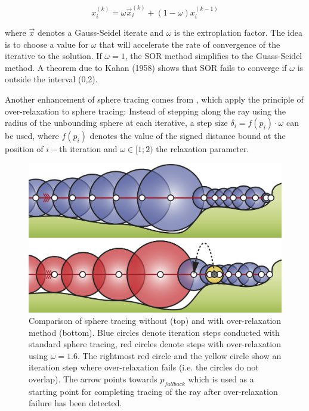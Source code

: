 \begin{equation}
	x_{i}^{(k)}=\omega\vec{x}_{i}^{(k)}+(1-\omega)x_{i}^{(k-1)}
\end{equation}

where $\vec{x}$ denotes a Gauss-Seidel iterate and $\omega$ is the extroplation factor. The idea is to choose a value for $\omega$ that will accelerate the rate of convergence of the iterative to the solution. If $\omega=1$, the SOR method simplifies to the Guass-Seidel method. A theorem due to Kahan (1958) shows that SOR fails to converge if $\omega$ is outside the interval (0,2).

Another enhancement of sphere tracing comes from \cite{a:Enhanced-Sphere-Tracing}, which apply the principle of over-relaxation to sphere tracing: Instead of stepping along the ray using the radius of the unbounding sphere at each iterative, a step size $\delta_{i}=f(p_{i})\cdot\omega$ can be used, where $f(p_{i})$ denotes the value of the signed distance bound at the position of $i-$th iteration and $\omega\in[1;2)$ the relaxation parameter.

\begin{figure}\label{f:over-relaxation}
	\includegraphics[width=1.0\textwidth]{graphics/df/over-relaxation}
	\caption{Comparison of sphere tracing without (top) and with over-relaxation method (bottom). Blue circles denote iteration steps conducted with standard sphere tracing, red circles denote steps with over-relaxation using $\omega=1.6$. The rightmost red circle and the yellow circle show an iteration step where over-relaxation fails (i.e. the circles do not overlap). The arrow points towards $p_{fallback}$ which is used as a starting point for completing tracing of the ray after over-relaxation failure has been detected.}
\end{figure} 

